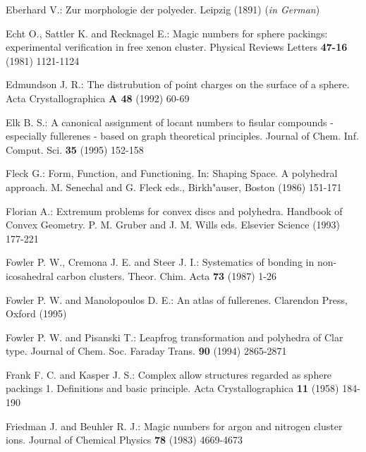 \begin{thebibliography}{99}
Eberhard V.:
Zur morphologie der polyeder. 
Leipzig (1891)
({\it in German})
\vspace{-3mm}

Echt O., Sattler K. and Recknagel E.:
Magic numbers for sphere packings: experimental verification in free xenon cluster.
Physical Reviews Letters {\bf 47-16} (1981) 1121-1124
\vspace{-3mm}

Edmundson J. R.:
The distrubution of point charges on the surface of a sphere.
Acta Crystallographica {\bf A 48} (1992) 60-69 
\vspace{-3mm}

Elk B. S.:
A canonical assignment of locant numbers to fisular compounds - especially
fullerenes - based on graph theoretical principles.
Journal of Chem. Inf. Comput. Sci. {\bf 35} (1995) 152-158 
\vspace{-3mm}

Fleck G.:
Form, Function, and Functioning.
In: Shaping Space. A polyhedral approach. 
M. Senechal and G. Fleck eds.,
Birkh\a"auser, Boston (1986) 151-171
\vspace{-3mm}

Florian A.:
Extremum problems for convex discs and polyhedra.
Handbook of Convex Geometry. P. M. Gruber and J. M. Wills eds. 
Elsevier Science (1993) 177-221
\vspace{-3mm}

Fowler P. W., Cremona J. E. and Steer J. I.:
Systematics of bonding in non-icosahedral carbon clusters.
Theor. Chim. Acta {\bf 73} (1987) 1-26
\vspace{-3mm}

Fowler P. W. and Manolopoulos D. E.:
An atlas of fullerenes.
Clarendon Press, Oxford (1995)
\vspace{-3mm}

Fowler P. W. and Pisanski T.:
Leapfrog transformation and polyhedra of Clar type.
Journal of Chem. Soc. Faraday Trans. {\bf 90} (1994) 2865-2871
\vspace{-3mm}

Frank F. C. and Kasper J. S.:
Complex allow structures regarded as sphere packings 1. 
Definitions and basic principle.
Acta Crystallographica {\bf 11} (1958) 184-190
\vspace{-3mm}

Friedman J. and Beuhler R. J.:
Magic numbers for argon and nitrogen cluster ions.
Journal of Chemical Physics {\bf 78} (1983) 4669-4673 
\vspace{-3mm}


\end{thebibliography}
